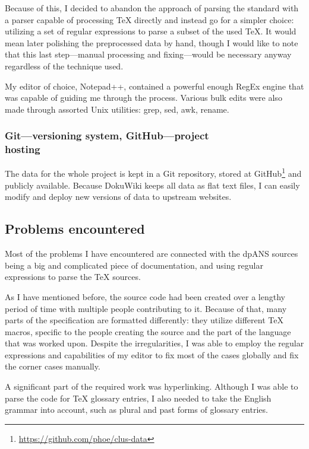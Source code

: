 Because of this, I decided to abandon the approach of parsing the standard with a parser capable of processing \TeX{} directly and instead go for a simpler choice: utilizing a set of regular expressions to parse a subset of the used \TeX{}. It would mean later polishing the preprocessed data by hand, though I would like to note that this last step---manual processing and fixing---would be necessary anyway regardless of the technique used.

My editor of choice, Notepad++, contained a powerful enough RegEx engine that was capable of guiding me through the process. Various bulk edits were also made through assorted Unix utilities: grep, sed, awk, rename.

\subsubsection{Git---versioning system, GitHub---project\\ hosting}

The data for the whole project is kept in a Git repository, stored at GitHub\footnote{\url{https://github.com/phoe/clus-data}} and publicly available. Because DokuWiki keeps all data as flat text files, I can easily modify and deploy new versions of data to upstream websites.

\subsection{Problems encountered}

Most of the problems I have encountered are connected with the dpANS sources being a big and complicated piece of documentation, and using regular expressions to parse the \TeX{} sources.

As I have mentioned before, the source code had been created over a lengthy period of time with multiple people contributing to it. Because of that, many parts of the specification are formatted differently: they utilize different \TeX{} macros, specific to the people creating the source and the part of the language that was worked upon. Despite the irregularities, I was able to employ the regular expressions and capabilities of my editor to fix most of the cases globally and fix the corner cases manually.

A significant part of the required work was hyperlinking. Although I was able to parse the code for \TeX{} glossary entries, I also needed to take the English grammar into account, such as plural and past forms of glossary entries.

